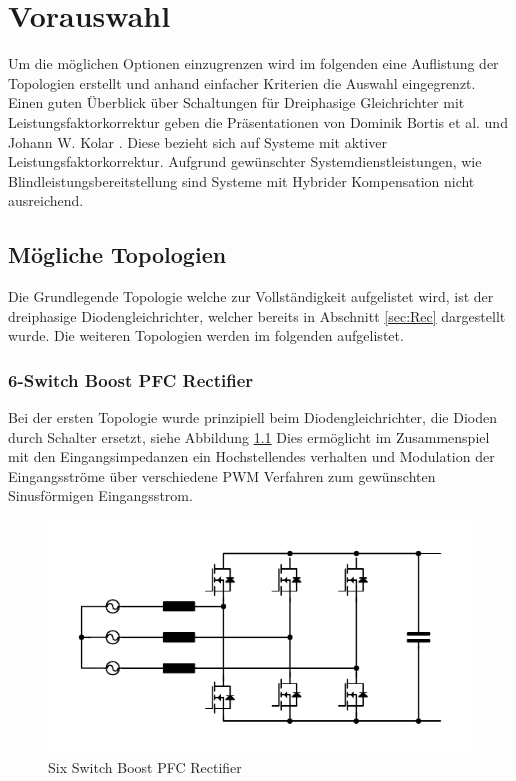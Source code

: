 \chapter{Vorauswahl}
Um die möglichen Optionen einzugrenzen wird im folgenden eine Auflistung der Topologien erstellt und anhand einfacher Kriterien die Auswahl eingegrenzt. Einen guten Überblick über Schaltungen für Dreiphasige Gleichrichter mit Leistungsfaktorkorrektur geben die  Präsentationen von Dominik Bortis et al. \cite{Advanced3PhPFC} und Johann W. Kolar \cite{Essenceof3pKolar}. Diese bezieht sich auf Systeme mit aktiver Leistungsfaktorkorrektur. Aufgrund gewünschter Systemdienstleistungen, wie Blindleistungsbereitstellung sind Systeme mit Hybrider Kompensation nicht ausreichend.


\section{Mögliche Topologien}
Die Grundlegende Topologie welche zur Vollständigkeit aufgelistet wird, ist der dreiphasige Diodengleichrichter, welcher bereits in Abschnitt \ref{sec:Rec} dargestellt wurde. Die weiteren Topologien werden im folgenden aufgelistet.
	\subsection{6-Switch Boost PFC Rectifier}
			Bei der ersten Topologie wurde prinzipiell beim Diodengleichrichter, die Dioden durch Schalter ersetzt, siehe Abbildung \ref{fig:sixswitchboost} Dies ermöglicht im Zusammenspiel mit den Eingangsimpedanzen ein Hochstellendes verhalten und Modulation der Eingangsströme über verschiedene \gls{PWM} Verfahren zum gewünschten Sinusförmigen Eingangsstrom.
			\begin{figure} [H]
				\centering
				\includegraphics[width=0.9\linewidth]{content/Grafiken/SixSwitchBoost}
				\caption{Six Switch Boost PFC Rectifier}
				\label{fig:sixswitchboost}
			\end{figure}
			
